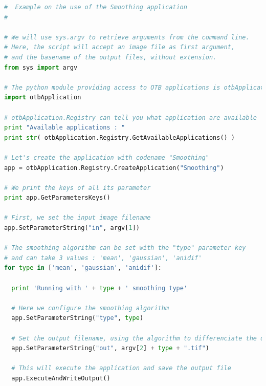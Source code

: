 \begin{lstlisting}[language=python,breaklines=true,breakatwhitespace=true,frame = tb,framerule = 0.25pt,fontadjust,backgroundcolor={\color{listlightgray}},basicstyle = {\ttfamily\scriptsize},keywordstyle = {\ttfamily\color{listkeyword}\textbf},identifierstyle = {\ttfamily},commentstyle = {\ttfamily\color{listcomment}\textit},stringstyle = {\ttfamily},showstringspaces = false,showtabs = false,numbers = none,numbersep = 6pt, numberstyle={\ttfamily\color{listnumbers}},tabsize = 2]
#  Example on the use of the Smoothing application
#

# We will use sys.argv to retrieve arguments from the command line.
# Here, the script will accept an image file as first argument,
# and the basename of the output files, without extension.
from sys import argv

# The python module providing access to OTB applications is otbApplication
import otbApplication

# otbApplication.Registry can tell you what application are available
print "Available applications : "
print str( otbApplication.Registry.GetAvailableApplications() )

# Let's create the application with codename "Smoothing"
app = otbApplication.Registry.CreateApplication("Smoothing")

# We print the keys of all its parameter
print app.GetParametersKeys()

# First, we set the input image filename
app.SetParameterString("in", argv[1])

# The smoothing algorithm can be set with the "type" parameter key
# and can take 3 values : 'mean', 'gaussian', 'anidif'
for type in ['mean', 'gaussian', 'anidif']:

  print 'Running with ' + type + ' smoothing type'

  # Here we configure the smoothing algorithm
  app.SetParameterString("type", type)

  # Set the output filename, using the algorithm to differenciate the outputs
  app.SetParameterString("out", argv[2] + type + ".tif")

  # This will execute the application and save the output file
  app.ExecuteAndWriteOutput()

\end{lstlisting}




